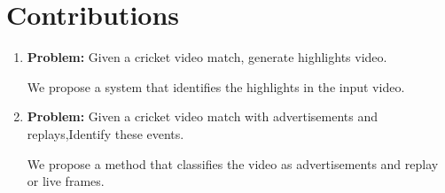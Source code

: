 \section{Contributions} %
\begin{enumerate}
    \item \textbf{Problem:} Given a cricket video match, generate highlights video.
    
    We propose a system that identifies the highlights in the input video.
    \item \textbf{Problem:} Given a cricket video match with advertisements and replays,Identify these events.
    
    We propose a method that classifies the video as advertisements and replay or live frames.
\end{enumerate}
